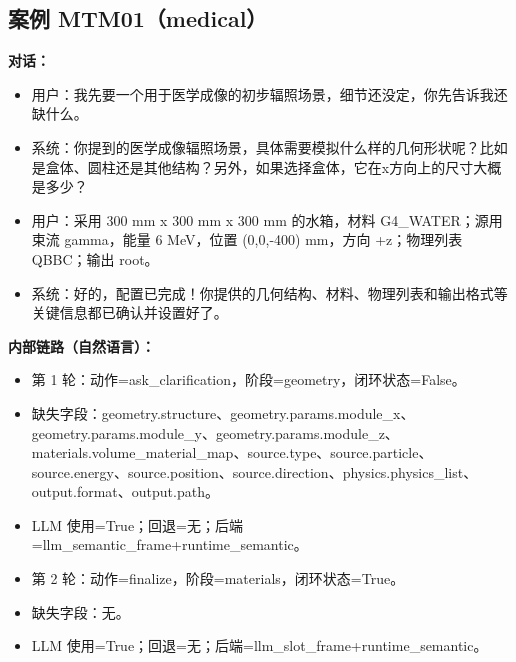 \documentclass[11pt]{ctexart}
\begin{document}
\subsection{案例 MTM01（medical）}
\textbf{对话：}
\begin{itemize}
\item 用户：我先要一个用于医学成像的初步辐照场景，细节还没定，你先告诉我还缺什么。
\item 系统：你提到的医学成像辐照场景，具体需要模拟什么样的几何形状呢？比如是盒体、圆柱还是其他结构？另外，如果选择盒体，它在x方向上的尺寸大概是多少？
\item 用户：采用 300 mm x 300 mm x 300 mm 的水箱，材料 G4\_WATER；源用束流 gamma，能量 6 MeV，位置 (0,0,-400) mm，方向 +z；物理列表 QBBC；输出 root。
\item 系统：好的，配置已完成！你提供的几何结构、材料、物理列表和输出格式等关键信息都已确认并设置好了。
\end{itemize}
\textbf{内部链路（自然语言）：}
\begin{itemize}
\item 第 1 轮：动作=ask\_clarification，阶段=geometry，闭环状态=False。
\item 缺失字段：geometry.structure、geometry.params.module\_x、geometry.params.module\_y、geometry.params.module\_z、materials.volume\_material\_map、source.type、source.particle、source.energy、source.position、source.direction、physics.physics\_list、output.format、output.path。
\item LLM 使用=True；回退=无；后端=llm\_semantic\_frame+runtime\_semantic。
\item 第 2 轮：动作=finalize，阶段=materials，闭环状态=True。
\item 缺失字段：无。
\item LLM 使用=True；回退=无；后端=llm\_slot\_frame+runtime\_semantic。
\end{itemize}
\end{document}
